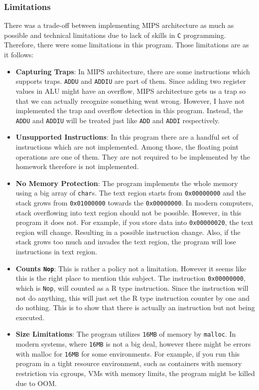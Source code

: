\documentclass{homework}
\begin{document}
\subsubsection{Limitations}
There was a trade-off between implementing MIPS architecture as much as possible and technical limitations due to lack of skills in \texttt{C} programming. Therefore, there were some limitations in this program. Those limitations are as it follows:
\begin{itemize}
    \item \textbf{Capturing Traps}: In MIPS architecture, there are some instructions which supports traps. \texttt{ADDU} and \texttt{ADDIU} are part of them. Since adding two register values in ALU might have an overflow, MIPS architecture gets us a trap so that we can actually recognize something went wrong. However, I have not implemented the trap and overflow detection in this program. Instead, the \texttt{ADDU} and \texttt{ADDIU} will be treated just like \texttt{ADD} and \texttt{ADDI} respectively. 
    \item \textbf{Unsupported Instructions}: In this program there are a handful set of instructions which are not implemented. Among those, the floating point operations are one of them. They are not required to be implemented by the homework therefore is not implemented.
    \item \textbf{No Memory Protection}: The program implements the whole memory using a big array of \texttt{char}s. The text region starts from \texttt{0x00000000} and the stack grows from \texttt{0x01000000} towards the \texttt{0x00000000}. In modern computers, stack overflowing into text region should not be possible. However, in this program it does not. For example, if you store data into \texttt{0x00000020}, the text region will change. Resulting in a possible instruction change. Also, if the stack grows too much and invades the text region, the program will lose instructions in text region. 
    \item \textbf{Counts \texttt{Nop}}: This is rather a policy not a limitation. However it seems like this is the right place to mention this subject. The instruction \texttt{0x00000000}, which is \texttt{Nop}, will counted as a R type instruction. Since the instruction will not do anything, this will just set the R type instruction counter by one and do nothing. This is to show that there is actually an instruction but not being executed.
    \item \textbf{Size Limitations}: The program utilizes \texttt{16MB} of memory by \texttt{malloc}. In modern systems, where \texttt{16MB} is not a big deal, however there might be errors with malloc for \texttt{16MB} for some environments. For example, if you run this program in a tight resource environment, such as containers with memory restriction via cgroups, VMs with memory limits, the program might be killed due to OOM.
\end{itemize}
\end{document}
